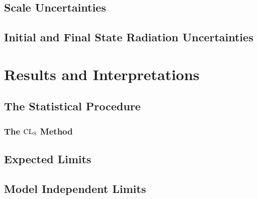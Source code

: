 \documentclass[10pt,twoside,cucitura,classica,english,openany]{toptesi}
\begin{document}


\subsection{Scale Uncertainties}
\label{sec:scale-uncertainty}



\subsection{Initial and Final State Radiation Uncertainties}
\label{sec:initial-final-state}



\section{Results and Interpretations}
\label{sec:results}




% 

\subsection{The Statistical Procedure}
\label{sec:stat-proc}



\subsubsection{The $\mathrm{CL}_\mathrm{S}$ Method}
\label{sec:cls-method}



\subsection{Expected Limits}
\label{sec:expected-limits}



\subsection{Model Independent Limits}
\label{sec:model-indep-limits}
\end{document}
